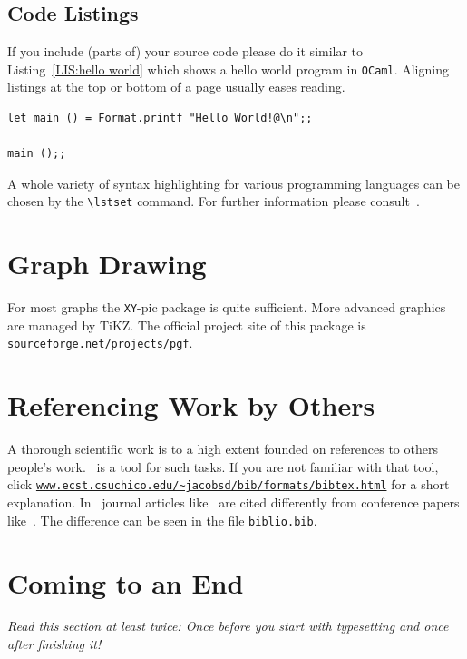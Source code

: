 \documentclass{howto}
\begin{document}
\subsection{Code Listings}
\label{FOR:lis}
If you include (parts of) your source code please do it similar to
Listing~\ref{LIS:hello world} which shows a hello world program in
\texttt{OCaml}. Aligning listings at the top or bottom of a page
usually eases reading.

\lstset{label=LIS:hello world}
\begin{table}[tb]
\begin{lstlisting}
let main () = Format.printf "Hello World!@\n";;

main ();;
\end{lstlisting}
\end{table}
A whole variety of syntax highlighting for various programming languages
can be chosen by the \verb'\lstset' command. For further information please
consult~\cite{LIS}.

\section{Graph Drawing}
\label{GRA:main}
For most graphs the \texttt{XY}-pic package \cite{XY} is quite sufficient.
More advanced graphics are managed by TiKZ. The official project site of
this package is
\href{http://sourceforge.net/projects/pgf}%
 {\texttt{sourceforge.net/projects/pgf}}.

\section{Referencing Work by Others}
\label{REF:main}
A thorough scientific work is to a high extent founded on references to
others people's work. \BibTeX\ is a tool for such tasks. If
you are not familiar with that tool, click
\href{http://www.ecst.csuchico.edu/~jacobsd/bib/formats/bibtex.html}%
{\texttt{www.ecst.csuchico.edu/\textasciitilde jacobsd/bib/formats/bibtex.html}}
for a short explanation.
In \BibTeX\ journal articles like~\cite{HM-IC07} are cited differently from
conference papers like~\cite{HM-AISC04}. The difference can be seen in the
file \texttt{biblio.bib}.

\section{Coming to an End}
\label{COM:main}
\emph{Read this section at least twice: Once before you start with
typesetting and once after finishing it!}
\end{document}
